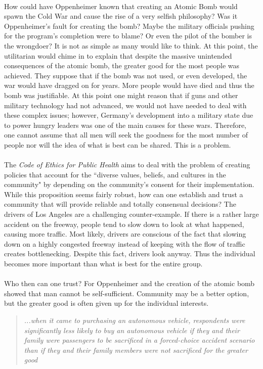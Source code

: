 \documentclass[10pt]{article}
\begin{document}
\paragraph{}
How could have Oppenheimer known that creating an Atomic Bomb would spawn the Cold War and cause the rise of a very selfish philosophy? Was it Oppenheimer's fault for creating the bomb? Maybe the military officials pushing for the program's completion were to blame? Or even the pilot of the bomber is the wrongdoer? It is not as simple as many would like to think. At this point, the utilitarian would chime in to explain that despite the massive unintended consequences of the atomic bomb, the greater good for the most people was achieved. They suppose that if the bomb was not used, or even developed, the war would have dragged on for years. More people would have died and thus the bomb was justifiable. At this point one might reason that if guns and other military technology had not advanced, we would not have needed to deal with these complex issues; however, Germany's development into a military state due to power hungry leaders was one of the main causes for these wars. Therefore, one cannot assume that all men will seek the goodness for the most number of people nor will the idea of what is best can be shared. This is a problem. 

\paragraph{}
The \textit{Code of Ethics for Public Health} aims to deal with the problem of creating policies that account for the ``diverse values, beliefs, and cultures in the community"\cite{Fleetwood2017} by depending on the community's consent for their implementation. While this proposition seems fairly robust, how can one establish and trust a community that will provide reliable and totally consensual decisions?  The drivers of Los Angeles are a challenging counter-example. If there is a rather large accident on the freeway, people tend to slow down to look at what happened, causing more traffic. Most likely, drivers are conscious of the fact that slowing down on a highly congested freeway instead of keeping with the flow of traffic creates bottlenecking. Despite this fact, drivers look anyway. Thus the individual becomes more important than what is best for the entire group.
\paragraph{}
Who then can one trust? For Oppenheimer and the creation of the atomic bomb showed that man cannot be self-sufficient. Community may be a better option, but the greater good is often given up for the individual interests.
{\small \begin{quote}
	\centering
	\textit{...when it came to purchasing an autonomous vehicle, respondents were significantly less likely to buy an autonomous vehicle if they and their family were passengers to be sacrificed in a forced-choice accident scenario than if they and their family members were not sacrificed for the greater good}\textsubscript{\cite{Fleetwood2017}\cite{Moral2016}}
\end{quote}}
\end{document}
